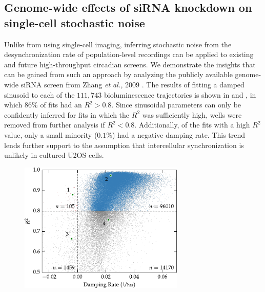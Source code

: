 \subsection{Genome-wide effects of siRNA knockdown on single-cell stochastic noise}

Unlike from using single-cell imaging, inferring stochastic noise from the desynchronization rate of population-level recordings can be applied to existing and future high-throughput circadian screens.
We demonstrate the insights that can be gained from such an approach by analyzing the publicly available genome-wide siRNA screen from Zhang {\itshape et al.,} 2009 \cite{Zhang2009}.
The results of fitting a damped sinusoid to each of the $111,743$ bioluminescence trajectories is shown in  and , in which $86\%$ of fits had an $R^2 > 0.8$.
Since sinusoidal parameters can only be confidently inferred for fits in which the $R^2$ was sufficiently high, wells were removed from further analysis if $R^2 < 0.8$.
Additionally, of the fits with a high $R^2$ value, only a small minority ($0.1\%$) had a negative damping rate.
This trend lends further support to the assumption that intercellular synchronization is unlikely in cultured U2OS cells. 

\begin{figure}[tbp]
  \begin{center}
    \includegraphics[width=0.7\textwidth]{chap6/figures/r2_vs_damping_a.pdf}
  \end{center}
\label{fig:fit_quality_a}
\end{figure}

